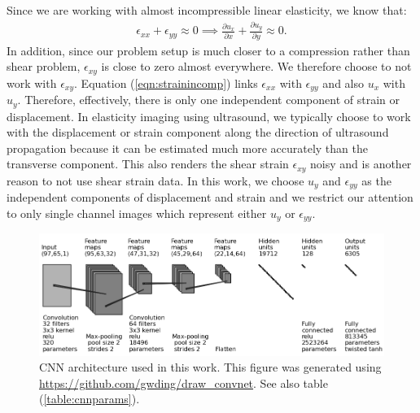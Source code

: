 \documentclass[12pt]{article}
\newcommand{\pdd}[2]{\frac{\partial{{#1}}}{\partial{#2}}}
\begin{document}
Since we are working with almost incompressible linear elasticity, we know \cite{book:hugheslinear} that:
\begin{align}
  \epsilon_{xx}+\epsilon_{yy}\approx{0} \implies \pdd{u_x}{x} + \pdd{u_y}{y} \approx{0} \label{eqn:strainincomp}. 
\end{align}
In addition, since our problem setup is much closer to a compression rather than shear problem, $\epsilon_{xy}$ is close to zero almost everywhere. We therefore choose to not work with $\epsilon_{xy}$. Equation (\ref{eqn:strainincomp}) links $\epsilon_{xx}$ with $\epsilon_{yy}$ and also $u_x$ with $u_y$. Therefore, effectively, there is only one independent component of strain or displacement. In elasticity imaging using ultrasound, we typically choose to work with the displacement or strain component along the direction of ultrasound propagation because it can be estimated much more accurately than the transverse component. This also renders the shear strain $\epsilon_{xy}$ noisy and is another reason to not use shear strain data. In this work, we choose $u_y$ and $\epsilon_{yy}$ as the independent components of displacement and strain and we restrict our attention to only single channel images which represent either $u_y$ or $\epsilon_{yy}$.
\begin{figure}[h]
  \centering
  \includegraphics[width=\linewidth]{Figures/convnet_fig_nach.png}
  \caption{\label{fig:cnn_arch}CNN architecture used in this work. This figure was generated using \url{https://github.com/gwding/draw_convnet}. See also table (\ref{table:cnnparams}).}
\end{figure}  
%
\end{document}
